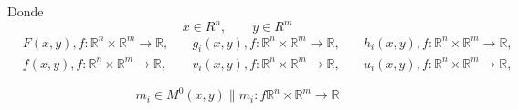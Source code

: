 \begin{samepage}
Donde 
\begin{equation*}
    x \in R^{n},\quad \quad y \in R^{m}
\end{equation*}
\begin{align*}
& F(x,y), f : \mathbb{R}^{n} \times \mathbb{R}^{m} \to \mathbb{R},
& \quad  g_i(x,y) , f : \mathbb{R}^{n} \times \mathbb{R}^{m} \to \mathbb{R} ,
& \quad h_i(x,y) , f : \mathbb{R}^{n} \times \mathbb{R}^{m} \to \mathbb{R} ,
\\
&f(x,y), f : \mathbb{R}^{n} \times \mathbb{R}^{m} \to \mathbb{R},
& \quad v_i(x,y) , f : \mathbb{R}^{n} \times \mathbb{R}^{m} \to \mathbb{R} ,
& \quad u_i(x,y) , f : \mathbb{R}^{n} \times \mathbb{R}^{m} \to \mathbb{R} ,
\end{align*} 
\end{samepage}

\begin{equation*}
m_i \in M^0(x,y) \| m_i : f \mathbb{R}^{n} \times \mathbb{R}^{m} \to \mathbb{R}
\end{equation*}

\newpage


